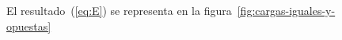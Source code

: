 \documentclass[a4paper,10pt]{article}
\def\rcurs{{\mbox{$\resizebox{.09in}{.08in}
      {\texttt{[image: ScriptR]}}$}}}
\def\brcurs{{\mbox{$\resizebox{.09in}{.08in}
      {\texttt{[image: BoldR]}}$}}}
\def\hrcurs{{\mbox{$\hat \brcurs$}}}
\begin{document}
\begin{soluc}
\begin{figure}[ht]
\begin{minipage}{.55\linewidth}
  El resultado~(\ref{eq:E}) se representa en la
  figura~\ref{fig:cargas-iguales-y-opuestas}
\end{minipage}
\end{figure}


%
%
%
%
%
%
%


\end{soluc}
\end{document}
